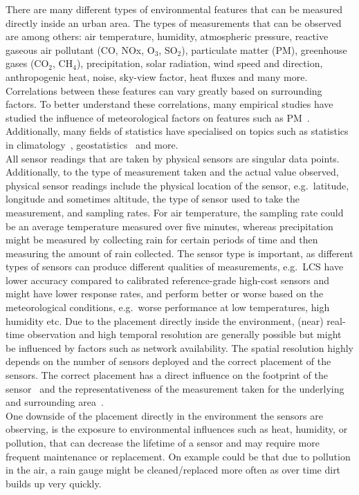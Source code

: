 There are many different types of environmental features that can be measured directly inside an urban area. The types of measurements that can be observed are among others: air temperature, humidity, atmospheric pressure, reactive gaseous air pollutant (CO, NOx, O$_3$, SO$_2$), particulate matter (PM), greenhouse gases (CO$_2$, CH$_4$), precipitation, solar radiation, wind speed and direction, anthropogenic heat, noise, sky-view factor, heat fluxes and many more.
Correlations between these features can vary greatly based on surrounding factors. To better understand these correlations, many empirical studies have studied the influence of meteorological factors on features such as PM~\cite{tai2010correlations}. Additionally, many fields of statistics have specialised on topics such as statistics in climatology~\cite{von2002statistical}, geostatistics~\cite{trangmar1986application} and more.\\
All sensor readings that are taken by physical sensors are singular data points. Additionally, to the type of measurement taken and the actual value observed, physical sensor readings include the physical location of the sensor, e.g.\ latitude, longitude and sometimes altitude, the type of sensor used to take the measurement, and sampling rates. For air temperature, the sampling rate could be an average temperature measured over five minutes, whereas precipitation might be measured by collecting rain for certain periods of time and then measuring the amount of rain collected. The sensor type is important, as different types of sensors can produce different qualities of measurements, e.g.\ LCS have lower accuracy compared to calibrated reference-grade high-cost sensors and might have lower response rates, and perform better or worse based on the meteorological conditions, e.g.\ worse performance at low temperatures, high humidity etc. Due to the placement directly inside the environment, (near) real-time observation and high temporal resolution are generally possible but might be influenced by factors such as network availability. The spatial resolution highly depends on the number of sensors deployed and the correct placement of the sensors. The correct placement has a direct influence on the footprint of the sensor~\cite{leclerc2014footprints} and the representativeness of the measurement taken for the underlying and surrounding area~\cite{oke2006guideline}.\\
One downside of the placement directly in the environment the sensors are observing, is the exposure to environmental influences such as heat, humidity, or pollution, that can decrease the lifetime of a sensor and may require more frequent maintenance or replacement. On example could be that due to pollution in the air, a rain gauge might be cleaned/replaced more often as over time dirt builds up very quickly.

